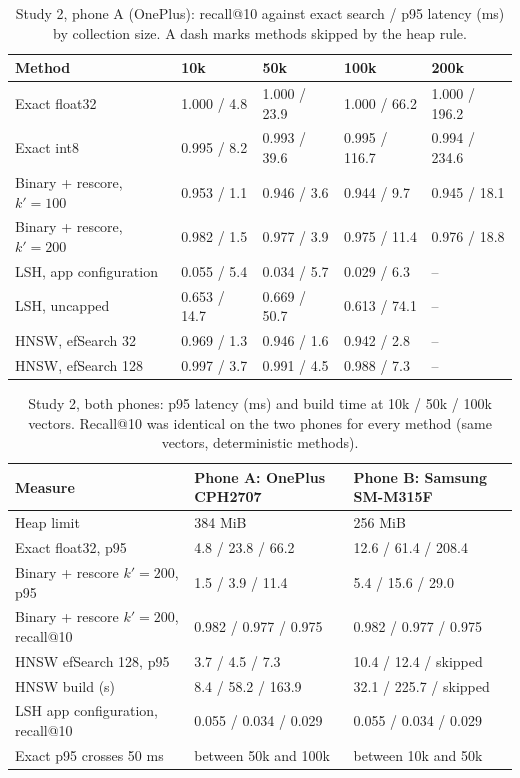 \documentclass[pdflatex,sn-basic,Numbered]{sn-jnl}
\begin{document}
\begin{table}[tbp]
\centering\footnotesize\setlength{\tabcolsep}{3pt}
\caption{Study 2, phone A (OnePlus): recall@10 against exact search / p95 latency (ms) by collection size. A dash marks methods skipped by the heap rule.}
\label{tab:scaling}
\begin{tabular}{lllll}
\toprule
Method & 10k & 50k & 100k & 200k \\
\midrule
Exact float32 & 1.000 / 4.8 & 1.000 / 23.9 & 1.000 / 66.2 & 1.000 / 196.2 \\
Exact int8 & 0.995 / 8.2 & 0.993 / 39.6 & 0.995 / 116.7 & 0.994 / 234.6 \\
Binary + rescore, $k'=100$ & 0.953 / 1.1 & 0.946 / 3.6 & 0.944 / 9.7 & 0.945 / 18.1 \\
Binary + rescore, $k'=200$ & 0.982 / 1.5 & 0.977 / 3.9 & 0.975 / 11.4 & 0.976 / 18.8 \\
LSH, app configuration & 0.055 / 5.4 & 0.034 / 5.7 & 0.029 / 6.3 & -- \\
LSH, uncapped & 0.653 / 14.7 & 0.669 / 50.7 & 0.613 / 74.1 & -- \\
HNSW, efSearch 32 & 0.969 / 1.3 & 0.946 / 1.6 & 0.942 / 2.8 & -- \\
HNSW, efSearch 128 & 0.997 / 3.7 & 0.991 / 4.5 & 0.988 / 7.3 & -- \\
\bottomrule
\end{tabular}
\end{table}

\begin{table}[tbp]
\centering\footnotesize\setlength{\tabcolsep}{3pt}
\caption{Study 2, both phones: p95 latency (ms) and build time at 10k / 50k / 100k vectors. Recall@10 was identical on the two phones for every method (same vectors, deterministic methods).}
\label{tab:devices}
\begin{tabular}{lll}
\toprule
Measure & Phone A: OnePlus CPH2707 & Phone B: Samsung SM-M315F \\
\midrule
Heap limit & 384 MiB & 256 MiB \\
Exact float32, p95 & 4.8 / 23.8 / 66.2 & 12.6 / 61.4 / 208.4 \\
Binary + rescore $k'=200$, p95 & 1.5 / 3.9 / 11.4 & 5.4 / 15.6 / 29.0 \\
Binary + rescore $k'=200$, recall@10 & 0.982 / 0.977 / 0.975 & 0.982 / 0.977 / 0.975 \\
HNSW efSearch 128, p95 & 3.7 / 4.5 / 7.3 & 10.4 / 12.4 / skipped \\
HNSW build (s) & 8.4 / 58.2 / 163.9 & 32.1 / 225.7 / skipped \\
LSH app configuration, recall@10 & 0.055 / 0.034 / 0.029 & 0.055 / 0.034 / 0.029 \\
Exact p95 crosses 50 ms & between 50k and 100k & between 10k and 50k \\
\bottomrule
\end{tabular}
\end{table}
\end{document}
